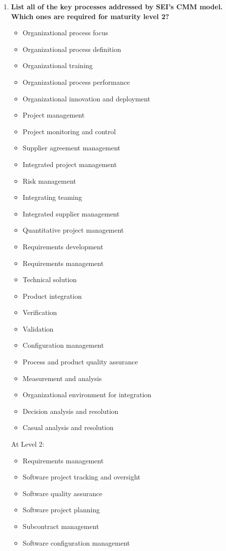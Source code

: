 \documentclass[11pt]{article}
\begin{document}
\begin{enumerate}
    \item \textbf{List all of the key processes addressed by SEI's CMM model. Which ones are required for maturity level 2?}
    \begin{itemize}
        \item Organizational process focus
        \item Organizational process definition
        \item Organizational training
        \item Organizational process performance
        \item Organizational innovation and deployment
        \item Project management
        \item Project monitoring and control
        \item Supplier agreement management
        \item Integrated project management
        \item Risk management
        \item Integrating teaming
        \item Integrated supplier management
        \item Quantitative project management
        \item Requirements development
        \item Requirements management
        \item Technical solution
        \item Product integration
        \item Verification
        \item Validation 
        \item Configuration management
        \item Process and product quality assurance
        \item Measurement and analysis
        \item Organizational environment for integration
        \item Decision analysis and resolution
        \item Casual analysis and resolution
    \end{itemize}
    
    \newpage
    At Level 2:
    \begin{itemize}
        \item Requirements management
        \item Software project tracking and oversight
        \item Software quality assurance
        \item Software project planning
        \item Subcontract management
        \item Software configuration management
    \end{itemize}
    

\end{enumerate}
\end{document}
